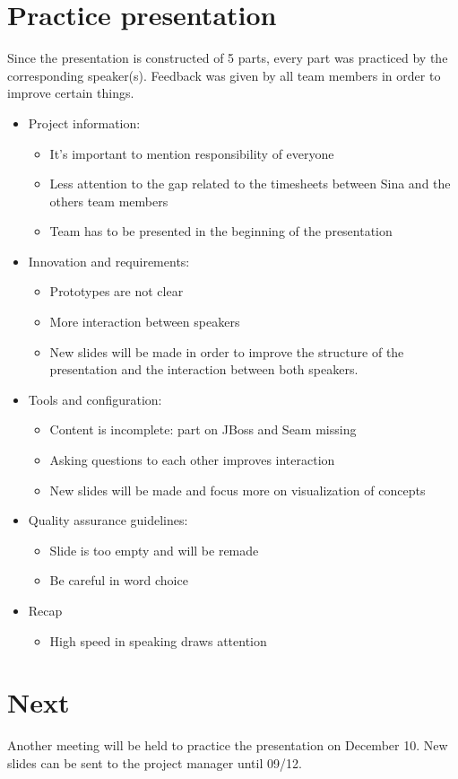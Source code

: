 \documentclass[a4paper, 12pt]{article}
\begin{document}
\section{Practice presentation}

Since the presentation is constructed of 5 parts, every part was practiced by the corresponding speaker(s). Feedback was given by all team members in order to improve certain things. 

\begin{itemize}
	
	\item Project information:
	\begin{itemize}
		\item It's important to mention responsibility of everyone
		\item Less attention to the gap related to the timesheets between Sina and the others team members 
		\item Team has to be presented in the beginning of the presentation
	\end{itemize}
	
	\item Innovation and requirements:
	\begin{itemize}
		\item Prototypes are not clear
		\item More interaction between speakers
		\item New slides will be made in order to improve the structure of the presentation and the interaction between both speakers. 
	\end{itemize}
	
	\item Tools and configuration:
	\begin{itemize}
		\item Content is incomplete: part on JBoss and Seam missing
		\item Asking questions to each other improves interaction
		\item New slides will be made and focus more on visualization of concepts
	\end{itemize}
	
	\item Quality assurance guidelines:
	\begin{itemize}
		\item Slide is too empty and will be remade
		\item Be careful in word choice
	\end{itemize}
	
	\item Recap
	\begin{itemize}
		\item High speed in speaking draws attention
	\end{itemize}
	
\end{itemize}


\section{Next}

Another meeting will be held to practice the presentation on December 10. New slides can be sent to the project manager until 09/12. 
\end{document}
